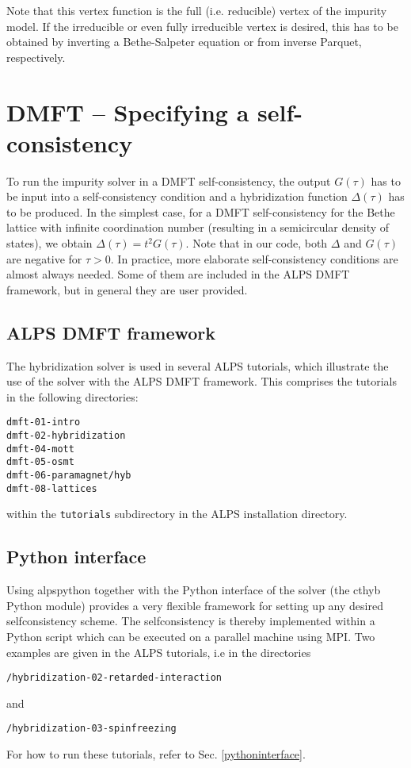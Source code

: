 \documentclass[aps,prb,floatfix,superscriptaddress,twocolumn,notitlepage]{revtex4-1}
\begin{document}
Note that this vertex function is the full (i.e. reducible) vertex of the impurity model. If the irreducible or even fully irreducible vertex is desired, this has to be obtained by inverting a Bethe-Salpeter equation or from inverse Parquet, respectively.

\section{DMFT -- Specifying a self-consistency}
To run the impurity solver in a DMFT self-consistency, the output $G(\tau)$ has to be input into a self-consistency condition and a hybridization function $\Delta(\tau)$ has to be produced.\cite{Georges96,Kotliar06} In the simplest case, for a DMFT self-consistency for the Bethe lattice with infinite coordination number (resulting in a semicircular density of states), we obtain $\Delta(\tau)=t^2G(\tau)$.
Note that in our code, both $\Delta$ and $G(\tau)$ are negative for $\tau>0$.
In practice, more elaborate self-consistency conditions are almost always needed. 
Some of them are included in the ALPS DMFT framework, but in general they are user provided.

\subsection{ALPS DMFT framework}

The hybridization solver is used in several ALPS tutorials, which illustrate the use of the solver with the ALPS DMFT framework. This comprises the tutorials in the following directories:
\begin{verbatim}
dmft-01-intro
dmft-02-hybridization
dmft-04-mott
dmft-05-osmt
dmft-06-paramagnet/hyb
dmft-08-lattices
\end{verbatim}
within the \verb#tutorials# subdirectory in the ALPS installation directory.

\subsection{Python interface}

Using alpspython together with the Python interface of the solver (the cthyb Python module) provides a very flexible framework for setting up any desired selfconsistency scheme.
The selfconsistency is thereby implemented within a Python script which can be executed on a parallel machine using MPI.
Two examples are given in the ALPS tutorials, i.e in the directories
\begin{verbatim}
/hybridization-02-retarded-interaction
\end{verbatim}
and
\begin{verbatim}
/hybridization-03-spinfreezing
\end{verbatim}
For how to run these tutorials, refer to Sec. \ref{pythoninterface}.
\end{document}
